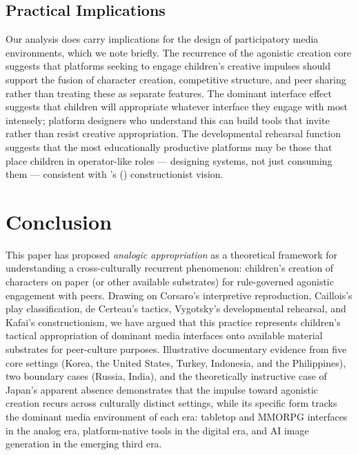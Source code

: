 \documentclass[12pt]{article}
\begin{document}
\subsection{Practical Implications}

Our analysis does carry implications for the design of participatory media environments, which we note briefly. The recurrence of the agonistic creation core suggests that platforms seeking to engage children's creative impulses should support the fusion of character creation, competitive structure, and peer sharing rather than treating these as separate features. The dominant interface effect suggests that children will appropriate whatever interface they engage with most intensely; platform designers who understand this can build tools that invite rather than resist creative appropriation. The developmental rehearsal function suggests that the most educationally productive platforms may be those that place children in operator-like roles --- designing systems, not just consuming them --- consistent with \citeauthor{kafai2016}'s (\citeyear{kafai2016}) constructionist vision.

\section{Conclusion}

This paper has proposed \emph{analogic appropriation} as a theoretical framework for understanding a cross-culturally recurrent phenomenon: children's creation of characters on paper (or other available substrates) for rule-governed agonistic engagement with peers. Drawing on Corsaro's interpretive reproduction, Caillois's play classification, de Certeau's tactics, Vygotsky's developmental rehearsal, and Kafai's constructionism, we have argued that this practice represents children's tactical appropriation of dominant media interfaces onto available material substrates for peer-culture purposes. Illustrative documentary evidence from five core settings (Korea, the United States, Turkey, Indonesia, and the Philippines), two boundary cases (Russia, India), and the theoretically instructive case of Japan's apparent absence demonstrates that the impulse toward agonistic creation recurs across culturally distinct settings, while its specific form tracks the dominant media environment of each era: tabletop and MMORPG interfaces in the analog era, platform-native tools in the digital era, and AI image generation in the emerging third era.
\end{document}

